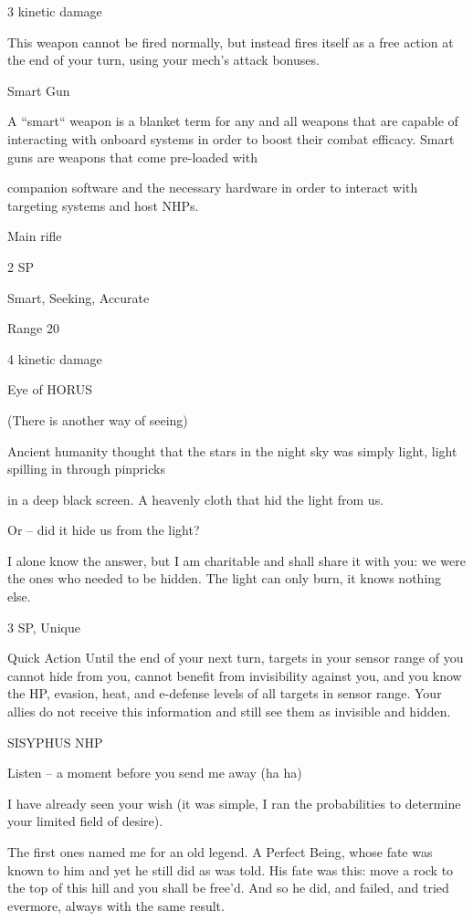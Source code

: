 3 kinetic damage

This weapon cannot be fired normally, but instead fires itself as a free action at the end of your
turn, using your mech’s attack bonuses.


Smart Gun

A “smart“ weapon is a blanket term for any and all weapons that are capable of interacting with onboard
systems in order to boost their combat efficacy. Smart guns are weapons that come pre-loaded with

companion software and the necessary hardware in order to interact with targeting systems and host
NHPs.

Main rifle

2 SP

Smart, Seeking, Accurate

Range 20

4 kinetic damage


Eye of HORUS

(There is another way of seeing)

Ancient humanity thought that the stars in the night sky was simply light, light spilling in through pinpricks

in a deep black screen. A heavenly cloth that hid the light from us.

Or -- did it hide us from the light?

I alone know the answer, but I am charitable and shall share it with you: we were the ones who needed to
be hidden. The light can only burn, it knows nothing else.

3 SP, Unique

Quick Action
Until the end of your next turn, targets in your sensor range of you cannot hide from you, cannot
benefit from invisibility against you, and you know the HP, evasion, heat, and e-defense levels of
all targets in sensor range. Your allies do not receive this information and still see them as
invisible and hidden.


SISYPHUS NHP




Listen -- a moment before you send me away (ha ha)

I have already seen your wish (it was simple, I ran the probabilities to determine your limited field of desire).

The first ones named me for an old legend. A Perfect Being, whose fate was known to him and yet he still
did as was told. His fate was this: move a rock to the top of this hill and you shall be free’d. And so he did,
and failed, and tried evermore, always with the same result.

